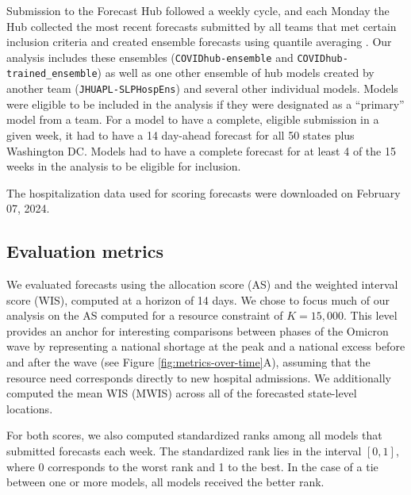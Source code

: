\documentclass{article}\usepackage[]{graphicx}\usepackage[]{xcolor}
\begin{document}
Submission to the Forecast Hub followed a weekly cycle, and each Monday the Hub collected the most recent forecasts
submitted by all teams that met certain inclusion criteria and created ensemble forecasts using quantile averaging
\citep{ray_comparing_2023}. Our analysis includes these ensembles (\texttt{COVIDhub-ensemble} and
\texttt{COVIDhub-trained\_ensemble}) as well as one other ensemble of hub models created by another team
(\texttt{JHUAPL-SLPHospEns}) and several other individual models. Models were eligible to be included in the analysis if
they were designated as a ``primary'' model from a team. For a model to have a complete, eligible submission in a given
week, it had to have a 14 day-ahead forecast for all 50 states plus Washington DC. Models had to have a complete
forecast for at least 4 of the 15 weeks in the analysis to be eligible for inclusion.



The hospitalization data used for scoring forecasts were downloaded on February 07, 2024.

\subsection{Evaluation metrics}

We evaluated forecasts using the allocation score (AS) and the weighted interval score (WIS), computed at a horizon of
14 days. We chose to focus much of our analysis on the AS computed for a resource constraint of $K=15,000$. This level
provides an anchor for interesting comparisons between phases of the Omicron wave by representing a national shortage at
the peak and a national excess before and after the wave (see Figure \ref{fig:metrics-over-time}A), assuming that the
resource need corresponds directly to new hospital admissions. We additionally computed the mean WIS (MWIS) across all
of the forecasted state-level locations. 

For both scores, we also computed standardized ranks among all models that submitted forecasts each week. The
standardized rank lies in the interval $[0, 1]$, where 0 corresponds to the worst rank and 1 to the best. In the case of
a tie between one or more models, all models received the better rank.
\end{document}
